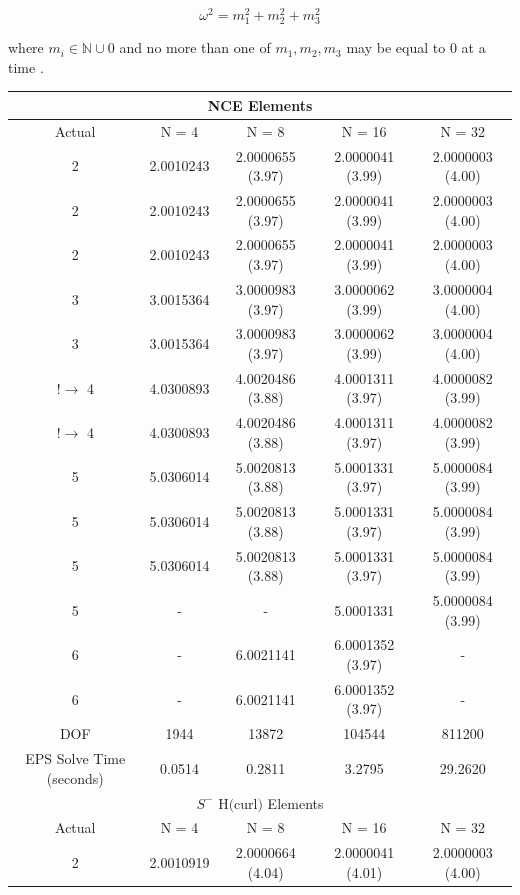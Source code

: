 \documentclass[manuscript,screen]{acmart}
\newcommand{\akg}[1]{\textcolor{blue}{\textbf{AG:} #1}}
\begin{document}
\[ \omega^2 = m_1^2 + m_2^2 + m_3^2 \]

\noindent where $m_i \in \mathbb{N} \cup {0}$ and no more than one of $m_1, m_2, m_3$ may be equal to $0$ at a time \cite{rognes2010efficient}.


\begin{center}
\begin{table}
\begin{tabular}{ c c c c c }
\multicolumn{5}{c}{NCE Elements} \\
\hline
Actual & N = 4 & N = 8 & N = 16 & N = 32 \\ 
\hline
2 &2.0010243 & 2.0000655 (3.97) & 2.0000041 (3.99) & 2.0000003 (4.00) \\  
2 & 2.0010243 & 2.0000655 (3.97) & 2.0000041 (3.99) & 2.0000003 (4.00)  \\
2 & 2.0010243 & 2.0000655 (3.97) & 2.0000041 (3.99) & 2.0000003 (4.00)\\
3 & 3.0015364 & 3.0000983 (3.97) & 3.0000062 (3.99) & 3.0000004 (4.00) \\
3 & 3.0015364 & 3.0000983 (3.97) & 3.0000062 (3.99) & 3.0000004 (4.00) \\
$! \rightarrow$ 4 & 4.0300893 & 4.0020486 (3.88) & 4.0001311 (3.97) & 4.0000082 (3.99) \\
$! \rightarrow$ 4 & 4.0300893 & 4.0020486 (3.88) & 4.0001311 (3.97) & 4.0000082 (3.99) \\
5 & 5.0306014 & 5.0020813 (3.88)& 5.0001331 (3.97) & 5.0000084 (3.99) \\
5 & 5.0306014 & 5.0020813 (3.88)& 5.0001331 (3.97) & 5.0000084 (3.99) \\
5 & 5.0306014 & 5.0020813 (3.88) & 5.0001331 (3.97) & 5.0000084 (3.99) \\
5 & - & - & 5.0001331 & 5.0000084 (3.99) \\
6 & - & 6.0021141 & 6.0001352 (3.97) & -  \\
6 & - & 6.0021141 & 6.0001352 (3.97) & - \\
\hline
DOF  & 1944 & 13872 & 104544 & 811200 \\
\hline
EPS Solve Time (seconds) & 0.0514 & 0.2811 & 3.2795 & 29.2620 \\
\hline
\multicolumn{5}{c}{$S^-$ H$($curl$)$ Elements} \\
\hline
Actual & N = 4 & N = 8 & N = 16 & N = 32 \\ 
\hline
2 &2.0010919 & 2.0000664 (4.04) & 2.0000041 (4.01) & 2.0000003 (4.00) \\  

\end{tabular}
\end{table}
\end{center}
\end{document}

